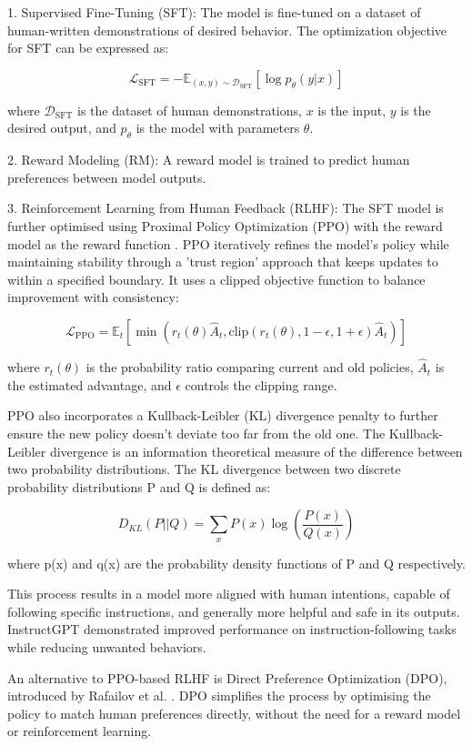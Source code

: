 \documentclass[a4paper, oneside]{discothesis}
\begin{document}
1. Supervised Fine-Tuning (SFT): The model is fine-tuned on a dataset of human-written demonstrations of desired behavior. The optimization objective for SFT can be expressed as:

   \[\mathcal{L}_{\text{SFT}} = -\mathbb{E}_{(x,y)\sim \mathcal{D}_{\text{SFT}}}[\log p_\theta(y|x)]\]

   where $\mathcal{D}_{\text{SFT}}$ is the dataset of human demonstrations, $x$ is the input, $y$ is the desired output, and $p_\theta$ is the model with parameters $\theta$.

2. Reward Modeling (RM): A reward model is trained to predict human preferences between model outputs.

3. Reinforcement Learning from Human Feedback (RLHF): The SFT model is further optimised using Proximal Policy Optimization (PPO) 
with the reward model as the reward function \cite{schulman2017proximal}. PPO iteratively refines the model's policy while maintaining stability through a 'trust region' approach that keeps updates to within a specified boundary. It uses a clipped objective function to balance improvement with consistency:

   \[\mathcal{L}_{\text{PPO}} = \mathbb{E}_t[\min(r_t(\theta)\hat{A}_t, \text{clip}(r_t(\theta), 1-\epsilon, 1+\epsilon)\hat{A}_t)]\]

   where $r_t(\theta)$ is the probability ratio comparing current and old policies, $\hat{A}_t$ is the estimated advantage, and $\epsilon$ controls the clipping range.

PPO also incorporates a Kullback-Leibler (KL) divergence penalty to further ensure the new policy doesn't deviate too far from the old one. The Kullback-Leibler divergence is an information theoretical measure of the difference between two probability distributions. The KL divergence between two discrete probability distributions P and Q is defined as:

\[D_{KL}(P||Q) = \sum_{x} P(x) \log\left(\frac{P(x)}{Q(x)}\right)\]

where p(x) and q(x) are the probability density functions of P and Q respectively.

This process results in a model more aligned with human intentions, capable of following specific instructions, and generally more helpful and safe in its outputs. InstructGPT demonstrated improved performance on instruction-following tasks while reducing unwanted behaviors.

An alternative to PPO-based RLHF is Direct Preference Optimization (DPO), introduced by Rafailov et al. \cite{rafailov2023direct}. 
DPO simplifies the process by optimising the policy to match human preferences directly, without the need for a reward model or reinforcement learning. 
\end{document}
